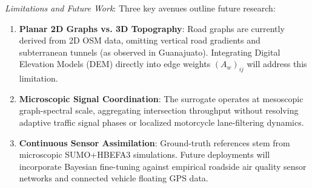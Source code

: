 \documentclass[journal]{IEEEtran}
\begin{document}
\textit{Limitations and Future Work}: Three key avenues outline future research:
\begin{enumerate}
    \item \textbf{Planar 2D Graphs vs. 3D Topography}: Road graphs are currently derived from 2D OSM data, omitting vertical road gradients and subterranean tunnels (as observed in Guanajuato). Integrating Digital Elevation Models (DEM) directly into edge weights $(A_w)_{ij}$ will address this limitation.
    \item \textbf{Microscopic Signal Coordination}: The surrogate operates at mesoscopic graph-spectral scale, aggregating intersection throughput without resolving adaptive traffic signal phases or localized motorcycle lane-filtering dynamics.
    \item \textbf{Continuous Sensor Assimilation}: Ground-truth references stem from microscopic SUMO+HBEFA3 simulations. Future deployments will incorporate Bayesian fine-tuning against empirical roadside air quality sensor networks and connected vehicle floating GPS data.
\end{enumerate}
\end{document}
